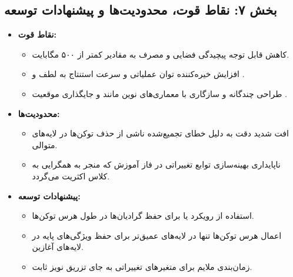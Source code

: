 \subsection*{بخش ۷: نقاط قوت، محدودیت‌ها و پیشنهادات توسعه }
\begin{itemize}
    \item \textbf{نقاط قوت:} 
    \begin{itemize}
        \item کاهش قابل توجه پیچیدگی فضایی و مصرف  به مقادیر کمتر از ۵۰۰ مگابایت.
        \item افزایش خیره‌کننده توان عملیاتی و سرعت استنتاج به لطف  و .
        \item طراحی چندگانه و سازگاری با معماری‌های نوین مانند  و جایگذاری موقعیت .
    \end{itemize}
    \item \textbf{محدودیت‌ها:}
    \begin{itemize}
        \item افت شدید دقت به دلیل خطای تجمیع‌شده ناشی از حذف توکن‌ها در لایه‌های متوالی.
        \item ناپایداری بهینه‌سازی توابع تغییراتی در فاز آموزش که منجر به همگرایی به کلاس اکثریت می‌گردد.
    \end{itemize}
    \item \textbf{پیشنهادات توسعه:}
    \begin{itemize}
        \item استفاده از رویکرد  یا  برای حفظ گرادیان‌ها در طول هرس توکن‌ها.
        \item اعمال هرس توکن‌ها تنها در لایه‌های عمیق‌تر  برای حفظ ویژگی‌های پایه در لایه‌های آغازین.
        \item زمان‌بندی ملایم  برای متغیرهای تغییراتی به جای تزریق نویز ثابت.
    \end{itemize}
\end{itemize}

